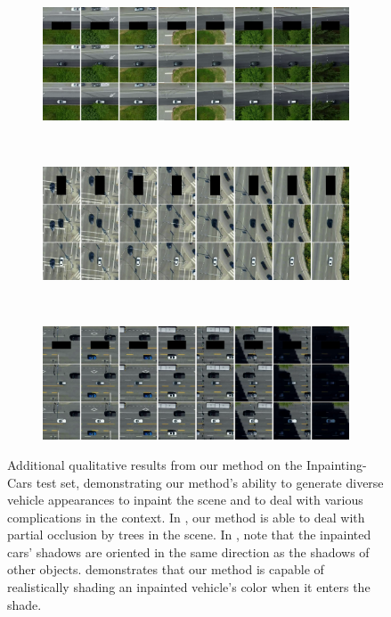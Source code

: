 \begin{figure}[t]
    \centering
    \begin{subfigure}[t]{\textwidth}
        \centering
        \includegraphics[width=\textwidth]{figures/additional-samples/cars_3028.pdf}
        \label{fig:extra-cars1}
    \end{subfigure}
    ~
    \begin{subfigure}[t]{\textwidth}
        \centering
        \includegraphics[width=\textwidth]{figures/additional-samples/cars_3067.pdf}
        \label{fig:extra-cars2}
    \end{subfigure}
    ~
    \begin{subfigure}[t]{\textwidth}
        \centering
        \includegraphics[width=\textwidth]{figures/additional-samples/cars_3093.pdf}
        \label{fig:extra-cars3}
    \end{subfigure}%
    \caption[Additional qualitative results from our method on the Inpainting-Cars
    test set.]{Additional qualitative results from our method on the Inpainting-Cars test set, demonstrating our method's ability to generate diverse vehicle appearances to inpaint the scene and to deal with various complications in the context.  In , our method is able to deal with partial occlusion by trees in the scene. In , note that the inpainted cars' shadows are oriented in the same direction as the shadows of other objects.  demonstrates that our method is capable of realistically shading an inpainted vehicle's color when it enters the shade.
    }
    \label{fig:extra-cars}
\end{figure}

